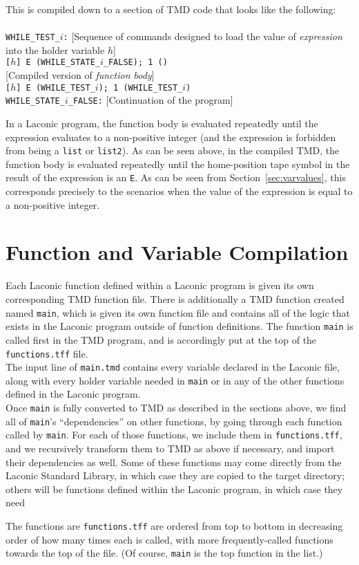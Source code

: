 \documentclass[11pt]{article}
\begin{document}
This is compiled down to a section of TMD code that looks like the following: \\ \\
\texttt{WHILE_TEST_}$i$\texttt{:} [Sequence of commands designed to load the value of \emph{expression} into the holder variable $h$] \\
\texttt{[}$h$\texttt{] E (WHILE_STATE_}$i$\texttt{_FALSE); 1 ()} \\ 
{}[Compiled version of \emph{function body}] \\
\texttt{[}$h$\texttt{] E (WHILE_TEST_}$i$\texttt{); 1 (WHILE_TEST_}$i$\texttt{)} \\
\texttt{WHILE_STATE_}$i$\texttt{_FALSE:} [Continuation of the program] 

In a Laconic program, the function body is evaluated repeatedly until the expression evaluates to a non-positive integer (and the expression is forbidden from being a \texttt{list} or \texttt{list2}). As can be seen above, in the compiled TMD, the function body is evaluated repeatedly until the home-position tape symbol in the result of the expression is an \texttt{E}. As can be seen from Section~\ref{sec:varvalues}, this corresponds precisely to the scenarios when the value of the expression is equal to a non-positive integer.

\section{Function and Variable Compilation} 

Each Laconic function defined within a Laconic program is given its own corresponding TMD function file. There is additionally a TMD function created named \texttt{main}, which is given its own function file and contains all of the logic that exists in the Laconic program outside of function definitions. The function \texttt{main} is called first in the TMD program, and is accordingly put at the top of the \texttt{functions.tff} file. \\

The input line of \texttt{main.tmd} contains every variable declared in the Laconic file, along with every holder variable needed in \texttt{main} or in any of the other functions defined in the Laconic program. \\

Once \texttt{main} is fully converted to TMD as described in the sections above, we find all of \texttt{main}'s ``dependencies'' on other functions, by going through each function called by \texttt{main}. For each of those functions, we include them in \texttt{functions.tff}, and we recursively transform them to TMD as above if necessary, and import their dependencies as well. Some of these functions may come directly from the Laconic Standard Library, in which case they are copied to the target directory; others will be functions defined within the Laconic program, in which case they need

The functions are \texttt{functions.tff} are ordered from top to bottom in decreasing order of how many times each is called, with more frequently-called functions towards the top of the file. (Of course, \texttt{main} is the top function in the list.)
\end{document}
